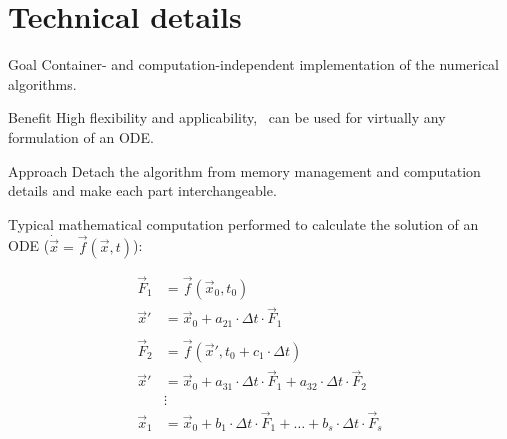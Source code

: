 \section{Technical details}


\begin{frame}
  \tableofcontents[currentsection] 
\end{frame}

\begin{frame}

\begin{block}{Goal}
 Container- and computation-independent implementation of the numerical algorithms.  
\end{block}

\begin{block}{Benefit}
 High flexibility and applicability, \odeint\ can be used for virtually any formulation of an ODE.
\end{block}
 
\begin{block}{Approach}
 Detach the algorithm from memory management and computation details and make each part interchangeable.
\end{block}

\end{frame}

\begin{frame}

 Typical mathematical computation performed to calculate the solution of an ODE ($\dot{\vec x} = \vec f(\vec x , t)$):

\begin{align*}
 \vec F_1 &= \vec f( \vec x_0 , t_0 ) \\
 \vec x' &= \vec x_0 + a_{21} \cdot \Delta t \cdot \vec F_1 \\ \\
 \vec F_2 &= \vec f( \vec x' , t_0 + c_1\cdot\Delta t ) \\
 \vec x' &= \vec x_0 + a_{31} \cdot \Delta t \cdot \vec F_1 + a_{32} \cdot \Delta t \cdot \vec F_2 \\
         &\vdots \\
 \vec x_1 &= \vec x_0 + b_1\cdot \Delta t \cdot \vec F_1 + \dots + b_s\cdot \Delta t \cdot \vec F_s
\end{align*} 

\end{frame}

